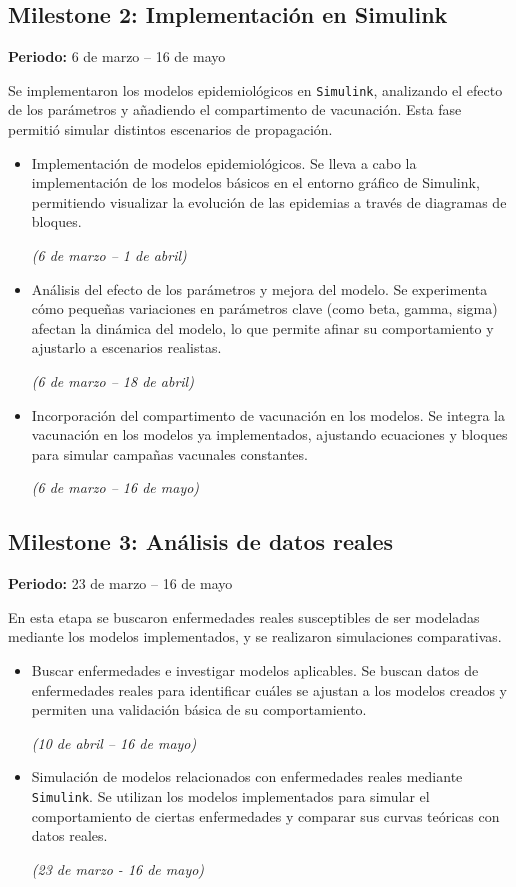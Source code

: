 \subsection*{Milestone 2: Implementación en Simulink}
\textbf{Periodo:} 6 de marzo – 16 de mayo

Se implementaron los modelos epidemiológicos en \texttt{Simulink}, analizando el efecto de los parámetros y añadiendo el compartimento de vacunación. Esta fase permitió simular distintos escenarios de propagación.

\begin{itemize}
    \item Implementación de modelos epidemiológicos. Se lleva a cabo la implementación de los modelos básicos en el entorno gráfico de Simulink, permitiendo visualizar la evolución de las epidemias a través de diagramas de bloques. 

    
    \textit{(6 de marzo – 1 de abril)}
    \item Análisis del efecto de los parámetros y mejora del modelo. Se experimenta cómo pequeñas variaciones en parámetros clave (como beta, gamma, sigma) afectan la dinámica del modelo, lo que permite afinar su comportamiento y ajustarlo a escenarios realistas.  
    
    \textit{(6 de marzo – 18 de abril)}
    \item Incorporación del compartimento de vacunación en los modelos. Se integra la vacunación en los modelos ya implementados, ajustando ecuaciones y bloques para simular campañas vacunales constantes.  
    
    \textit{(6 de marzo – 16 de mayo)}
\end{itemize}

\subsection*{Milestone 3: Análisis de datos reales}
\textbf{Periodo:} 23 de marzo – 16 de mayo

En esta etapa se buscaron enfermedades reales susceptibles de ser modeladas mediante los modelos implementados, y se realizaron simulaciones comparativas.

\begin{itemize}
    \item Buscar enfermedades e investigar modelos aplicables.
    Se buscan datos de enfermedades reales para identificar cuáles se ajustan a los modelos creados y permiten una validación básica de su comportamiento. 
    
    \textit{(10 de abril – 16 de mayo)}
    \item Simulación de modelos relacionados con enfermedades reales mediante \texttt{Simulink}. Se utilizan los modelos implementados para simular el comportamiento de ciertas enfermedades y comparar sus curvas teóricas con datos reales.

    
    \textit{(23 de marzo - 16 de mayo)}
\end{itemize}

